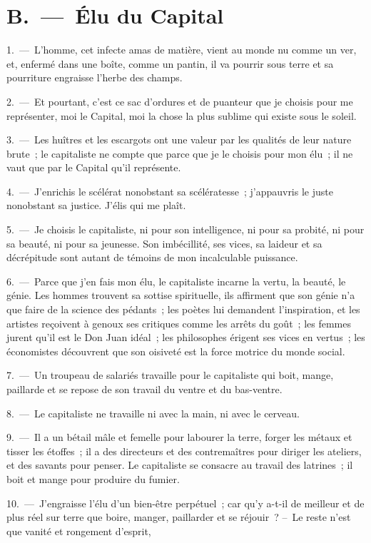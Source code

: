 \documentclass[french,twoside]{book} %
\begin{document}
\section[{B. — Élu du Capital}]{B. — Élu du Capital}
1. — L'homme, cet infecte amas de matière, vient au monde nu comme un ver, et, enfermé dans une boîte, comme un pantin, il va pourrir sous terre et sa pourriture engraisse l’herbe des champs.\par
2. — Et pourtant, c’est ce sac d’ordures et de puanteur que je choisis pour me représenter, moi le Capital, moi la chose la plus sublime qui existe sous le soleil.\par
3. — Les huîtres et les escargots ont une valeur par les qualités de leur nature brute ; le capitaliste ne compte que parce que je le choisis pour mon élu ; il ne vaut que par le Capital qu’il représente.\par
4. — J'enrichis le scélérat nonobstant sa scélératesse ; j’appauvris le juste nonobstant sa justice. J'élis qui me plaît.\par
5. — Je choisis le capitaliste, ni pour son intelligence, ni pour sa probité, ni pour sa beauté, ni pour sa jeunesse. Son imbécillité, ses vices, sa laideur et sa décrépitude sont autant de témoins de mon incalculable puissance.\par
6. — Parce que j’en fais mon élu, le capitaliste incarne la vertu, la beauté, le génie. Les hommes trouvent sa sottise spirituelle, ils affirment que son génie n’a que faire de la science des pédants ; les poètes lui demandent l’inspiration, et les artistes reçoivent à genoux ses critiques comme les arrêts du goût ; les femmes jurent qu’il est le Don Juan idéal ; les philosophes érigent ses vices en vertus ; les économistes découvrent que son oisiveté est la force motrice du monde social.\par
7. — Un troupeau de salariés travaille pour le capitaliste qui boit, mange, paillarde et se repose de son travail du ventre et du bas-ventre.\par
8. — Le capitaliste ne travaille ni avec la main, ni avec le cerveau.\par
9. — Il a un bétail mâle et femelle pour labourer la terre, forger les métaux et tisser les étoffes ; il a des directeurs et des contremaîtres pour diriger les ateliers, et des savants pour penser. Le capitaliste se consacre au travail des latrines ; il boit et mange pour produire du fumier.\par
10. — J'engraisse l’élu d’un bien-être perpétuel ; car qu’y a-t-il de meilleur et de plus réel sur terre que boire, manger, paillarder et se réjouir ? – Le reste n’est que vanité et rongement d’esprit,\par
\end{document}
